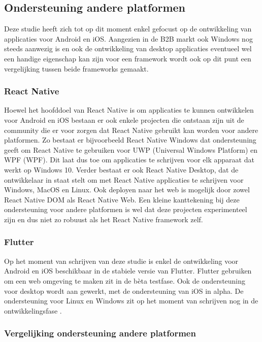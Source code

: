 \subsection{Ondersteuning andere platformen}
\label{subsec:ondersteuningAnderePlatformen}

Deze studie heeft zich tot op dit moment enkel gefocust op de ontwikkeling van applicaties voor Android en iOS. Aangezien in de B2B markt ook Windows nog steeds aanwezig is en ook de ontwikkeling van desktop applicaties eventueel wel een handige eigenschap kan zijn voor een framework wordt ook op dit punt een vergelijking tussen beide frameworks gemaakt.

\subsubsection{React Native}

Hoewel het hoofddoel van React Native is om applicaties te kunnen ontwikkelen voor Android en iOS bestaan er ook enkele projecten die ontstaan zijn uit de community die er voor zorgen dat React Native gebruikt kan worden voor andere platformen. Zo bestaat er bijvoorbeeld React Native Windows dat ondersteuning geeft om React Native te gebruiken voor UWP (Universal Windows Platform) en WPF (WPF). Dit laat dus toe om applicaties te schrijven voor elk apparaat dat werkt op Windows 10. Verder bestaat er ook React Native Desktop, dat de ontwikkelaar in staat stelt om met React Native applicaties te schrijven voor Windows, MacOS en Linux. Ook deployen naar het web is mogelijk door zowel React Native DOM als React Native Web. Een kleine kanttekening bij deze ondersteuning voor andere platformen is wel dat deze projecten experimenteel zijn en dus niet zo robuust als het React Native framework zelf.

\subsubsection{Flutter}

Op het moment van schrijven van deze studie is enkel de ontwikkeling voor Android en iOS beschikbaar in de stabiele versie van Flutter. Flutter gebruiken om een web omgeving te maken zit in de bèta testfase. Ook de ondersteuning voor desktop wordt aan gewerkt, met de ondersteuning van iOS in alpha. De ondersteuning voor Linux en Windows zit op het moment van schrijven nog in de ontwikkelingsfase \autocite{FlutterPlatformSupport}.

\subsubsection{Vergelijking ondersteuning andere platformen}

